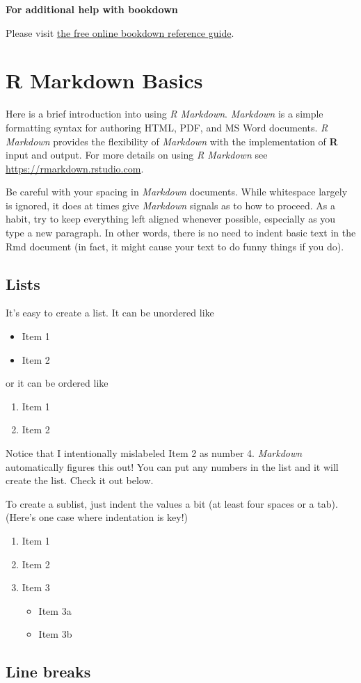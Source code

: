 \documentclass[12pt,twoside]{reedthesis}
\providecommand{\tightlist}{%
  \setlength{\itemsep}{0pt}\setlength{\parskip}{0pt}}
\begin{document}
\textbf{For additional help with bookdown}

Please visit \href{https://bookdown.org/yihui/bookdown/}{the free online bookdown reference guide}.

\hypertarget{rmd-basics}{%
\chapter{R Markdown Basics}\label{rmd-basics}}

Here is a brief introduction into using \emph{R Markdown}. \emph{Markdown} is a simple formatting syntax for authoring HTML, PDF, and MS Word documents. \emph{R Markdown} provides the flexibility of \emph{Markdown} with the implementation of \textbf{R} input and output. For more details on using \emph{R Markdown} see \url{https://rmarkdown.rstudio.com}.

Be careful with your spacing in \emph{Markdown} documents. While whitespace largely is ignored, it does at times give \emph{Markdown} signals as to how to proceed. As a habit, try to keep everything left aligned whenever possible, especially as you type a new paragraph. In other words, there is no need to indent basic text in the Rmd document (in fact, it might cause your text to do funny things if you do).

\hypertarget{lists}{%
\section{Lists}\label{lists}}

It's easy to create a list. It can be unordered like
\begin{itemize}
\tightlist
\item
  Item 1
\item
  Item 2
\end{itemize}
or it can be ordered like
\begin{enumerate}
\def\labelenumi{\arabic{enumi}.}
\tightlist
\item
  Item 1
\item
  Item 2
\end{enumerate}
Notice that I intentionally mislabeled Item 2 as number 4. \emph{Markdown} automatically figures this out! You can put any numbers in the list and it will create the list. Check it out below.

To create a sublist, just indent the values a bit (at least four spaces or a tab). (Here's one case where indentation is key!)
\begin{enumerate}
\def\labelenumi{\arabic{enumi}.}
\tightlist
\item
  Item 1
\item
  Item 2
\item
  Item 3
  \begin{itemize}
  \tightlist
  \item
    Item 3a
  \item
    Item 3b
  \end{itemize}
\end{enumerate}
\hypertarget{line-breaks}{%
\section{Line breaks}\label{line-breaks}}
\end{document}
